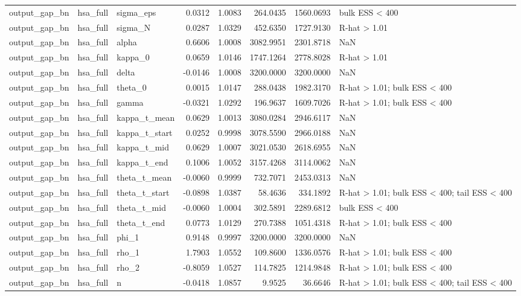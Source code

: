 \begin{tabular}{lllrrrrl}
output\_gap\_bn & hsa\_full & sigma\_eps & 0.0312 & 1.0083 & 264.0435 & 1560.0693 & bulk ESS < 400 \\
output\_gap\_bn & hsa\_full & sigma\_N & 0.0287 & 1.0329 & 452.6350 & 1727.9130 & R-hat > 1.01 \\
output\_gap\_bn & hsa\_full & alpha & 0.6606 & 1.0008 & 3082.9951 & 2301.8718 & NaN \\
output\_gap\_bn & hsa\_full & kappa\_0 & 0.0659 & 1.0146 & 1747.1264 & 2778.8028 & R-hat > 1.01 \\
output\_gap\_bn & hsa\_full & delta & -0.0146 & 1.0008 & 3200.0000 & 3200.0000 & NaN \\
output\_gap\_bn & hsa\_full & theta\_0 & 0.0015 & 1.0147 & 288.0438 & 1982.3170 & R-hat > 1.01; bulk ESS < 400 \\
output\_gap\_bn & hsa\_full & gamma & -0.0321 & 1.0292 & 196.9637 & 1609.7026 & R-hat > 1.01; bulk ESS < 400 \\
output\_gap\_bn & hsa\_full & kappa\_t\_mean & 0.0629 & 1.0013 & 3080.0284 & 2946.6117 & NaN \\
output\_gap\_bn & hsa\_full & kappa\_t\_start & 0.0252 & 0.9998 & 3078.5590 & 2966.0188 & NaN \\
output\_gap\_bn & hsa\_full & kappa\_t\_mid & 0.0629 & 1.0007 & 3021.0530 & 2618.6955 & NaN \\
output\_gap\_bn & hsa\_full & kappa\_t\_end & 0.1006 & 1.0052 & 3157.4268 & 3114.0062 & NaN \\
output\_gap\_bn & hsa\_full & theta\_t\_mean & -0.0060 & 0.9999 & 732.7071 & 2453.0313 & NaN \\
output\_gap\_bn & hsa\_full & theta\_t\_start & -0.0898 & 1.0387 & 58.4636 & 334.1892 & R-hat > 1.01; bulk ESS < 400; tail ESS < 400 \\
output\_gap\_bn & hsa\_full & theta\_t\_mid & -0.0060 & 1.0004 & 302.5891 & 2289.6812 & bulk ESS < 400 \\
output\_gap\_bn & hsa\_full & theta\_t\_end & 0.0773 & 1.0129 & 270.7388 & 1051.4318 & R-hat > 1.01; bulk ESS < 400 \\
output\_gap\_bn & hsa\_full & phi\_1 & 0.9148 & 0.9997 & 3200.0000 & 3200.0000 & NaN \\
output\_gap\_bn & hsa\_full & rho\_1 & 1.7903 & 1.0552 & 109.8600 & 1336.0576 & R-hat > 1.01; bulk ESS < 400 \\
output\_gap\_bn & hsa\_full & rho\_2 & -0.8059 & 1.0527 & 114.7825 & 1214.9848 & R-hat > 1.01; bulk ESS < 400 \\
output\_gap\_bn & hsa\_full & n & -0.0418 & 1.0857 & 9.9525 & 36.6646 & R-hat > 1.01; bulk ESS < 400; tail ESS < 400 \\

\end{tabular}
